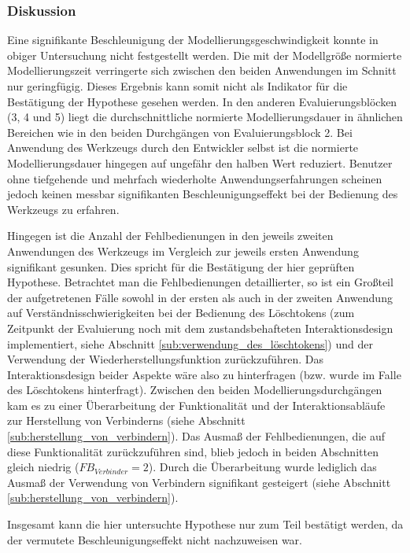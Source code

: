 \subsubsection{Diskussion} 

Eine signifikante Beschleunigung der Modellierungsgeschwindigkeit konnte in obiger Untersuchung nicht festgestellt werden. Die mit der Modellgröße normierte Modellierungszeit verringerte sich zwischen den beiden Anwendungen im Schnitt nur geringfügig. Dieses Ergebnis kann somit nicht als Indikator für die Bestätigung der Hypothese gesehen werden. In den anderen Evaluierungsblöcken (3, 4 und 5) liegt die durchschnittliche normierte Modellierungsdauer in ähnlichen Bereichen wie in den beiden Durchgängen von Evaluierungsblock 2. Bei Anwendung des Werkzeugs durch den Entwickler selbst ist die normierte Modellierungsdauer hingegen auf ungefähr den halben Wert reduziert. Benutzer ohne tiefgehende und mehrfach wiederholte Anwendungserfahrungen scheinen jedoch keinen messbar signifikanten Beschleunigungseffekt bei der Bedienung des Werkzeugs zu erfahren.

Hingegen ist die Anzahl der Fehlbedienungen in den jeweils zweiten Anwendungen des Werkzeugs im Vergleich zur jeweils ersten Anwendung signifikant gesunken. Dies spricht für die Bestätigung der hier geprüften Hypothese. Betrachtet man die Fehlbedienungen detaillierter, so ist ein Großteil der aufgetretenen Fälle sowohl in der ersten als auch in der zweiten Anwendung auf Verständnisschwierigkeiten bei der Bedienung des Löschtokens (zum Zeitpunkt der Evaluierung noch mit dem zustandsbehafteten Interaktionsdesign implementiert, siehe Abschnitt \ref{sub:verwendung_des_löschtokens}) und der Verwendung der Wiederherstellungsfunktion zurückzuführen. Das Interaktionsdesign beider Aspekte wäre also zu hinterfragen (bzw. wurde im Falle des Löschtokens hinterfragt). Zwischen den beiden Modellierungsdurchgängen kam es zu einer Überarbeitung der Funktionalität und der Interaktionsabläufe zur Herstellung von Verbinderns (siehe Abschnitt \ref{sub:herstellung_von_verbindern}). Das Ausmaß der Fehlbedienungen, die auf diese Funktionalität zurückzuführen sind, blieb jedoch in beiden Abschnitten gleich niedrig ($FB_{Verbinder}=2$). Durch die Überarbeitung wurde lediglich das Ausmaß der Verwendung von Verbindern signifikant gesteigert (siehe Abschnitt \ref{sub:herstellung_von_verbindern}).

Insgesamt kann die hier untersuchte Hypothese nur zum Teil bestätigt werden, da der vermutete Beschleunigungseffekt nicht nachzuweisen war.

